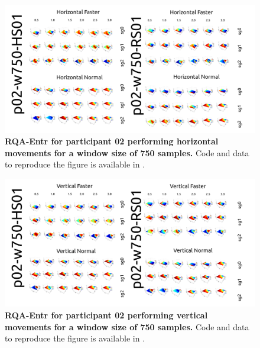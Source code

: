 \documentclass[12pt]{article}
\begin{document}
\newpage
\begin{figure}[ht!]
\centering
\includegraphics{figures/rqa/output/epsilons/rqa-epsilonsp02w750Horizontal}
    	\caption{
	{\bf RQA-Entr for participant 02 performing horizontal movements for a window size of 750 samples.}
	Code and data to reproduce the figure is available in \cite{srep2020}.
        }
    \label{fig-p02-H-w750}
\end{figure}
\begin{figure}[hb!]
\centering
\includegraphics{figures/rqa/output/epsilons/rqa-epsilonsp02w750Vertical}
    	\caption{
	{\bf RQA-Entr for participant 02 performing vertical movements for a window size of 750 samples.}
	Code and data to reproduce the figure is available in \cite{srep2020}.
        }
    \label{fig-p02-V-w750}
\end{figure}
\end{document}
